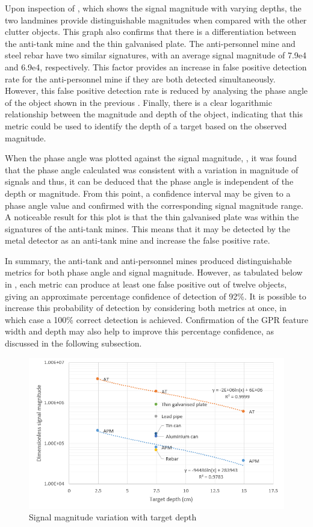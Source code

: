\documentclass[main.tex]{subfiles}
\begin{document}
Upon inspection of , which shows the signal magnitude with varying depths, the two landmines provide distinguishable magnitudes when compared with the other clutter objects. This graph also confirms that there is a differentiation between the anti-tank mine and the thin galvanised plate. The anti-personnel mine and steel rebar have two similar signatures, with an average signal magnitude of 7.9e4 and 6.9e4, respectively. This factor provides an increase in false positive detection rate for the anti-personnel mine if they are both detected simultaneously. However, this false positive detection rate is reduced by analysing the phase angle of the object shown in the previous . Finally, there is a clear logarithmic relationship between the magnitude and depth of the object, indicating that this metric could be used to identify the depth of a target based on the observed magnitude. 

When the phase angle was plotted against the signal magnitude, , it was found that the phase angle calculated was consistent with a variation in magnitude of signals and thus, it can be deduced that the phase angle is independent of the depth or magnitude. From this point, a confidence interval may be given to a phase angle value and confirmed with the corresponding signal magnitude range. A noticeable result for this plot is that the thin galvanised plate was within the signatures of the anti-tank mines. This means that it may be detected by the metal detector as an anti-tank mine and increase the false positive rate. 

In summary, the anti-tank and anti-personnel mines produced distinguishable metrics for both phase angle and signal magnitude. However, as tabulated below in , each metric can produce at least one false positive out of twelve objects, giving an approximate percentage confidence of detection of 92\%. It is possible to increase this probability of detection by considering both metrics at once, in which case a 100\% correct detection is achieved. Confirmation of the GPR feature width and depth may also help to improve this percentage confidence, as discussed in the following subsection. 

\begin{figure}[ht]
\includegraphics[width=\textwidth]{5-Testing/magDepth.PNG}
\centering
\caption{Signal magnitude variation with target depth }
\end{figure}
\end{document}
